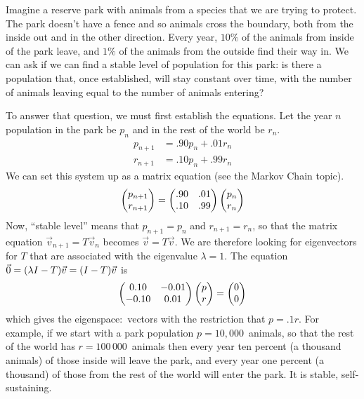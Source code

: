Imagine a reserve park with animals from a species that we are 
trying to protect.
The park doesn't have a fence and so animals cross the boundary, 
both from the inside out and in the other direction.
Every year, $10\%$ of the animals from inside of the park leave, and  
$1\%$ of the animals from the outside 
find their way in.
We can ask if we can find a stable level of population for this park:
is there a population that, once established, will stay constant over time,
with the number of animals leaving equal to  the number of animals entering?

To answer that question, we must first establish the equations.
Let the year $n$ population in the park be $p_n$ and 
in the rest of the world be $r_n$.
\begin{align*}
  p_{n+1} 
  &=.90p_n+.01r_n    \\
  r_{n+1}
  &=.10p_n+.99r_n 
\end{align*}
We can  set this system up as a matrix equation (see the Markov Chain topic).
\begin{equation*}
  \begin{pmatrix} p_{n+1} \\ r_{n+1} \end{pmatrix}
  =\begin{pmatrix}
    .90  &.01  \\
    .10  &.99
  \end{pmatrix}
  \begin{pmatrix} p_{n} \\ r_{n} \end{pmatrix}
\end{equation*}
Now, ``stable level'' means that $p_{n+1}=p_n$ and $r_{n+1}=r_n$, so that the 
matrix equation $\vec{v}_{n+1}=T\vec{v}_{n}$  becomes $\vec{v}=T\vec{v}$.
We are therefore looking for eigenvectors for $T$ that are associated with
the eigenvalue $\lambda=1$.
The  equation $\vec{0}=(\lambda I-T)\vec{v}=(I-T)\vec{v}$ is
\begin{equation*}
  \begin{pmatrix}
      0.10  &-0.01  \\
      -0.10  &0.01
  \end{pmatrix}
  \begin{pmatrix} p \\ r \end{pmatrix}=
  \begin{pmatrix} 0 \\ 0 \end{pmatrix}
\end{equation*}
which gives the eigenspace:~vectors with the restriction that $p=.1r$.
For example,
if we start with a park population $p=10,000$~animals,
so that the rest of the world has $r=100\,000$~animals then every year 
ten percent (a thousand animals) of those inside will leave the park, 
and every year one percent (a thousand) of those from the rest of
the world will enter the park.
It is stable, self-sustaining. 

